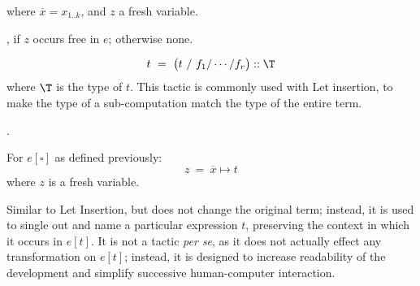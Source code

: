 where $\overline{x}=x_{1..k}$, and $z$ a fresh variable.

\Obligations \self, if $z$ occurs free in $e$; otherwise none.

\[t ~=~ \big(t~/~f_1/\cdots/f_r\big) :: \T\]
%
where $\T$ is the type of $t$. This tactic is commonly used with Let insertion,
to make the type of a sub-computation match the type of the entire term.

\Obligations \self.

\vspace{3mm}
For $e[\square]$ as defined previously:
\[z ~=~ \overline{x}\mapsto t\]
%
where $z$ is a fresh variable.

Similar to Let Insertion, but does not change the original term; instead,
it is used to single out and name a particular expression $t$, preserving the context
in which it occurs in $e[t]$. It is not a tactic {\it per se}, as it does not
actually effect any transformation on $e[t]$; instead, it is designed to increase
readability of the development and simplify successive human-computer interaction.
